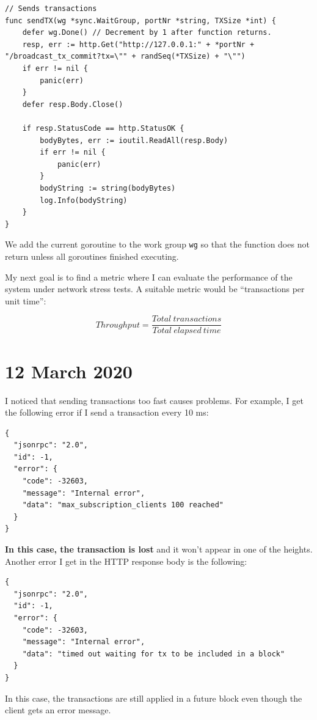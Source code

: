 \documentclass{article}
\begin{document}
\begin{lstlisting}
// Sends transactions
func sendTX(wg *sync.WaitGroup, portNr *string, TXSize *int) {
	defer wg.Done() // Decrement by 1 after function returns.
	resp, err := http.Get("http://127.0.0.1:" + *portNr + "/broadcast_tx_commit?tx=\"" + randSeq(*TXSize) + "\"")
	if err != nil {
		panic(err)
	}
	defer resp.Body.Close()

	if resp.StatusCode == http.StatusOK {
		bodyBytes, err := ioutil.ReadAll(resp.Body)
		if err != nil {
			panic(err)
		}
		bodyString := string(bodyBytes)
		log.Info(bodyString)
	}
}
\end{lstlisting}

We add the current goroutine to the work group \texttt{wg} so that the function does not return unless all goroutines finished executing.

My next goal is to find a metric where I can evaluate the performance of the system under network stress tests. A suitable metric would be ``transactions per unit time'':

$$Throughput = \frac{Total\ transactions}{Total\ elapsed\ time}$$

\section*{12 March 2020}

I noticed that sending transactions too fast causes problems. For example, I get the following error if I send a transaction every 10 ms:

\begin{lstlisting}
{
  "jsonrpc": "2.0",
  "id": -1,
  "error": {
    "code": -32603,
    "message": "Internal error",
    "data": "max_subscription_clients 100 reached"
  }
}
\end{lstlisting}

\textbf{In this case, the transaction is lost} and it won't appear in one of the heights. Another error I get in the HTTP response body is the following:

\begin{lstlisting}
{
  "jsonrpc": "2.0",
  "id": -1,
  "error": {
    "code": -32603,
    "message": "Internal error",
    "data": "timed out waiting for tx to be included in a block"
  }
}
\end{lstlisting}

In this case, the transactions are still applied in a future block even though the client gets an error message.
\end{document}
